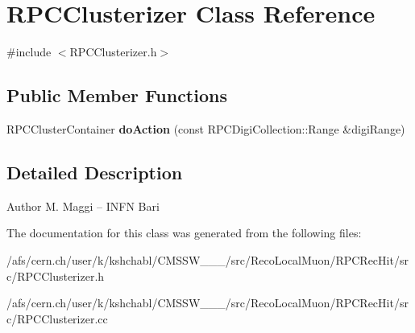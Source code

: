 \hypertarget{classRPCClusterizer}{\section{R\-P\-C\-Clusterizer Class Reference}
\label{classRPCClusterizer}
}


{\ttfamily \#include $<$R\-P\-C\-Clusterizer.\-h$>$}

\subsection*{Public Member Functions}
\begin{DoxyCompactItemize}
\item 
\hypertarget{classRPCClusterizer_a8756415e04dc6e3f4110347e798082c4}{R\-P\-C\-Cluster\-Container {\bfseries do\-Action} (const R\-P\-C\-Digi\-Collection\-::\-Range \&digi\-Range)}\label{classRPCClusterizer_a8756415e04dc6e3f4110347e798082c4}

\end{DoxyCompactItemize}


\subsection{Detailed Description}
\begin{DoxyAuthor}{Author}
M. Maggi -- I\-N\-F\-N Bari 
\end{DoxyAuthor}


The documentation for this class was generated from the following files\-:\begin{DoxyCompactItemize}
\item 
/afs/cern.\-ch/user/k/kshchabl/\-C\-M\-S\-S\-W\-\_\-\_\-\_/src/\-Reco\-Local\-Muon/\-R\-P\-C\-Rec\-Hit/src/R\-P\-C\-Clusterizer.\-h\item 
/afs/cern.\-ch/user/k/kshchabl/\-C\-M\-S\-S\-W\-\_\-\_\-\_/src/\-Reco\-Local\-Muon/\-R\-P\-C\-Rec\-Hit/src/R\-P\-C\-Clusterizer.\-cc\end{DoxyCompactItemize}
